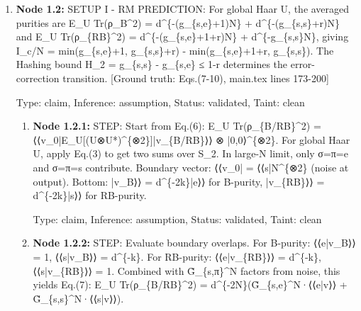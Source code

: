 \documentclass{article}
\begin{document}
\begin{enumerate}
\begin{enumerate}
  Type: claim, Inference: assumption, Status: validated, Taint: clean

\item \textbf{Node 1.1.4:} STEP: Define noisy overlap G̃(q,N)\_\{π,σ\} = ⟨⟨π|N\textasciicircum{}\{⊗2\}|σ⟩⟩. For depolarizing N(ρ)=(1-γ)ρ+γ1/d: G̃(d,N) = ((d\textasciicircum{}2, d), (d, 1+(d\textasciicircum{}2-1)(1-γ)\textasciicircum{}2)). Ground truth: main.tex line 158-160 defines G̃ and gives the depolarizing matrix.

  Type: claim, Inference: assumption, Status: validated, Taint: clean

\end{enumerate}
\item \textbf{Node 1.2:} SETUP I - RM PREDICTION: For global Haar U, the averaged purities are E\_U Tr(ρ\_B\textasciicircum{}2) = d\textasciicircum{}\{-(g\_\{s,e\}+1)N\} + d\textasciicircum{}\{-(g\_\{s,s\}+r)N\} and E\_U Tr(ρ\_\{RB\}\textasciicircum{}2) = d\textasciicircum{}\{-(g\_\{s,e\}+1+r)N\} + d\textasciicircum{}\{-g\_\{s,s\}N\}, giving I\_c/N = min(g\_\{s,e\}+1, g\_\{s,s\}+r) - min(g\_\{s,e\}+1+r, g\_\{s,s\}). The Hashing bound H\_2 = g\_\{s,s\} - g\_\{s,e\} ≤ 1-r determines the error-correction transition. [Ground truth: Eqs.(7-10), main.tex lines 173-200]

  Type: claim, Inference: assumption, Status: validated, Taint: clean

\begin{enumerate}
\item \textbf{Node 1.2.1:} STEP: Start from Eq.(6): E\_U Tr(ρ\_\{B/RB\}\textasciicircum{}2) = ⟨⟨v\_0|E\_U[(U⊗U*)\textasciicircum{}\{⊗2\}]|v\_\{B/RB\}⟩⟩ ⊗ |0,0⟩\textasciicircum{}\{⊗2\}. For global Haar U, apply Eq.(3) to get two sums over S\_2. In large-N limit, only σ=π=e and σ=π=s contribute. Boundary vector: ⟨⟨v\_0| = ⟨⟨s|N\textasciicircum{}\{⊗2\} (noise at output). Bottom: |v\_B⟩⟩ = d\textasciicircum{}\{-2k\}|e⟩⟩ for B-purity, |v\_\{RB\}⟩⟩ = d\textasciicircum{}\{-2k\}|s⟩⟩ for RB-purity.

  Type: claim, Inference: assumption, Status: validated, Taint: clean

\item \textbf{Node 1.2.2:} STEP: Evaluate boundary overlaps. For B-purity: ⟨⟨e|v\_B⟩⟩ = 1, ⟨⟨s|v\_B⟩⟩ = d\textasciicircum{}\{-k\}. For RB-purity: ⟨⟨e|v\_\{RB\}⟩⟩ = d\textasciicircum{}\{-k\}, ⟨⟨s|v\_\{RB\}⟩⟩ = 1. Combined with G̃\_\{s,π\}\textasciicircum{}N factors from noise, this yields Eq.(7): E\_U Tr(ρ\_\{B/RB\}\textasciicircum{}2) = d\textasciicircum{}\{-2N\}(G̃\_\{s,e\}\textasciicircum{}N·⟨⟨e|v⟩⟩ + G̃\_\{s,s\}\textasciicircum{}N·⟨⟨s|v⟩⟩).


\end{enumerate}
\end{enumerate}
\end{document}
